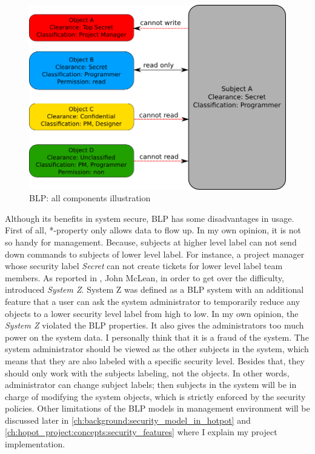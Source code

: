 \begin{figure}[bth]
\myfloatalign
\includegraphics[width=1.0\linewidth]{gfx/chapter_2/blp_example}
\caption[BLP: all components illustration]{BLP: all components illustration}
\label{fig:blp_full}
\end{figure}

Although its benefits in system secure, BLP has some disadvantages in usage.
First of all, *-property only allows data to flow up.
In my own opinion, it is not so handy for management.
Because, subjects at higher level label can not send down commands to subjects of lower level label.
For instance, a project manager whose security label \emph{Secret} can not create tickets for lower level label team members.
As reported in \cite{ross:2008}, John McLean, in order to get over the difficulty, introduced \emph{System Z}.
System Z was defined as a BLP system with an additional feature that a user can ask the system administrator to temporarily reduce any objects to a lower security level label \ie from high to low.
In my own opinion, the \emph{System Z} violated the BLP properties.
It also gives the administrators too much power on the system data.
I personally think that it is a fraud of the system.
The system administrator should be viewed as the other subjects in the system, which means that they are also labeled with a specific security level.
Besides that, they should only work with the subjects labeling, not the objects.
In other words, administrator can change subject labels; 
then subjects in the system will be in charge of modifying the system objects, which is strictly enforced by the security policies.
Other limitations of the BLP models in management environment will be discussed later in \autoref{ch:background:security_model_in_hotpot} and \autoref{ch:hopot_project:concepts:security_features} where I explain my project implementation.

